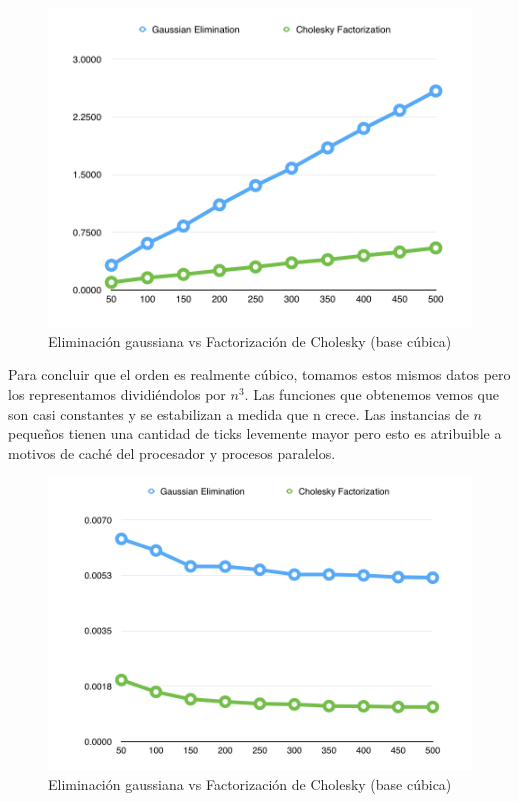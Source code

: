 \begin{figure}[h!]
  \begin{center}
	\includegraphics[scale=0.50]{imagenes/cuantitative/default/default2.png}
	\caption{Eliminaci\'on gaussiana vs Factorizaci\'on de Cholesky (base c\'ubica)}
	\label{bChange}
  \end{center}
\end{figure}
\newpage

Para concluir que el orden es realmente c\'ubico, tomamos estos mismos datos pero los representamos dividi\'endolos por $n^{3}$. Las funciones que obtenemos vemos que son casi constantes y se estabilizan a medida que n crece. Las instancias de $n$ pequeños tienen una cantidad de ticks levemente mayor pero esto es atribuible a motivos de cach\'e del procesador y procesos paralelos.

\begin{figure}[h!]
  \begin{center}
	\includegraphics[scale=0.50]{imagenes/cuantitative/default/default3.png}
	\caption{Eliminaci\'on gaussiana vs Factorizaci\'on de Cholesky (base c\'ubica)}
	\label{bChange}
  \end{center}
\end{figure}
\newpage